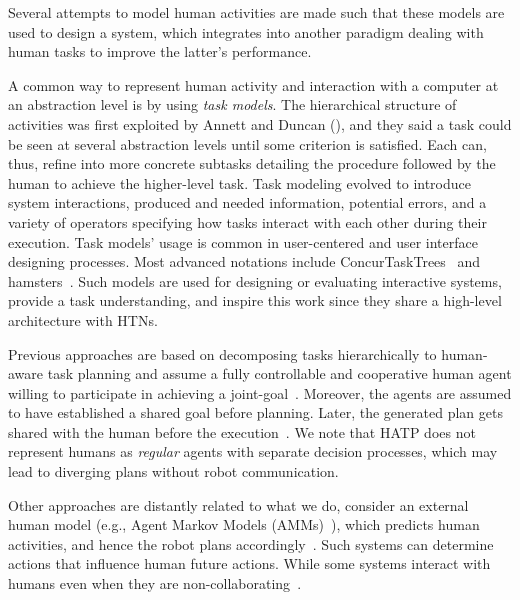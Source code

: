 \documentclass[letterpaper]{article} %
\newcommand{\note}[2][]{\added[#1,comment={#2}]{}}
\begin{document}
Several attempts to model human activities are made such that these models are used to design a system, which integrates into another paradigm dealing with human tasks to improve the latter's performance. 

A common way to represent human activity and interaction with a computer at an abstraction level is by using \textit{task models}. The hierarchical structure of activities was first exploited by Annett and Duncan (\citeyear{annett1967task}), and they said a task could be seen at several abstraction levels until some criterion is satisfied. Each can, thus, refine into more concrete subtasks detailing the procedure followed by the human to achieve the higher-level task.
Task modeling evolved to introduce system interactions, produced and needed information, potential errors, and a variety of operators specifying how tasks interact with each other during their execution. Task models' usage is common in user-centered and user interface designing processes. Most advanced notations include {\sc ConcurTaskTrees}~\cite{paterno2004concurtasktrees} and {\sc hamsters}~\cite{martinie2019analysing}.
Such models are used for designing or evaluating interactive systems, provide a task understanding, and inspire this work since they share a high-level architecture with HTNs. 

Previous approaches are based on decomposing tasks hierarchically to human-aware task planning and assume a fully controllable and cooperative human agent willing to participate in achieving a  joint-goal~\cite{alami2006toward,alili2009planning,lallement2014hatp,de2015hatp,lallement2018hatp}. 
Moreover, the agents are assumed to have established a shared goal before planning. 
Later, the generated plan gets shared with the human before the execution~\cite{milliez2016using}.
We note that HATP does not represent humans as \textit{regular} agents with separate decision processes, which may lead to diverging plans without robot communication.

Other approaches are distantly related to what we do, consider an external human model (e.g., Agent Markov Models (AMMs)~\cite{unhelkar2020decision,UnhelkarLS19}), which predicts human activities, and hence the robot plans accordingly~\cite{hoffman2007effects,unhelkar2020decision,UnhelkarLS19}. Such systems can determine actions that influence human future actions. While some systems interact with humans even when they are non-collaborating~\cite{buckingham2020robot}.
\end{document}
